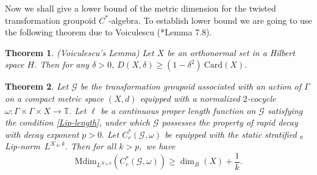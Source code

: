 \documentclass[a4paper,11pt,reqno]{amsart}
\theoremstyle{plain}
\newtheorem{thm}{Theorem}[section]
\theoremstyle{mainthmstyle}
\theoremstyle{named}
\numberwithin{equation}{section}
\newcommand{\clipnorm}{$_{\text{\rm c}}$Lip-norm}
\begin{document}
Now we shall give a lower bound of the metric dimension for the twisted transformation groupoid $C^{\ast}$-algebra. To establish lower bound we are going to use the following theorem due to Voiculescu (\cite{Voiculescu}*{Lemma 7.8}).
\begin{thm}(Voiculescu's Lemma)
\label{Voiculescu} Let $X$ be an orthonormal set in a Hilbert space $H$. Then for any $\delta>0$, $D(X,\delta)\geq(1-\delta^{2})\ {\mathrm {Card}}(X).$
\end{thm}

\begin{thm}  \label{Mdim lower bound}
Let $\mathcal{G}$ be the transformation groupoid associated with an action of $\Gamma$ on a compact metric space $(X, d)$ equipped with a normalized $2$-cocycle $\omega : \Gamma \times \Gamma \times X \rightarrow \mathbb T.$ Let $\ell$ be a continuous proper length function on $\mathcal G$ satisfying the condition \eqref{Lip-length}, under which $\mathcal G$ possesses the property of rapid decay with decay exponent $p > 0.$ Let $C_r^{\ast}(\mathcal {G}, \omega)$ be equipped with the static stratified \clipnorm\ $L^{\mathcal{K}_{S}, k}.$ Then for all $k > p,$ we have
$$\mathrm {Mdim}_{L^{\mathcal K_S, k}} \left (C_r^{\ast} (\mathcal G, \omega) \right) \geq \dim_B (X) + \frac{1}{k}.$$
\end{thm}
\end{document}
